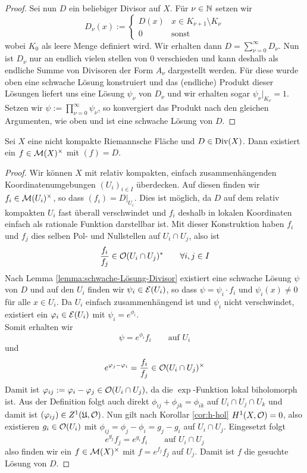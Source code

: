 \begin{proof}
  Sei nun $D$ ein beliebiger Divisor auf $X$. Für $\nu \in \mathbb{N}$
  setzen wir
  \[
  D_\nu(x) := \begin{cases} D(x) & x \in K_{\nu+1}\setminus K_\nu\\ 0
    & \text{sonst}\end{cases}
  \]
  wobei $K_0$ als leere Menge definiert wird. Wir erhalten dann $D =
  \sum_{\nu = 0}^\infty D_\nu$. 
  Nun ist $D_\nu$ nur an endlich vielen stellen von 0 verschieden und
  kann deshalb als endliche Summe von Divisoren der Form $A_\nu$
  dargestellt werden. Für diese wurde oben eine schwache Lösung
  konstruiert und das (endliche) Produkt dieser Lösungen liefert uns
  eine Lösung $\psi_\nu$ von $D_\nu$ und wir erhalten sogar $\psi_\nu
  |_{K_\nu} = 1$. 
  Setzen wir $\psi := \prod_{\nu=0}^\infty \psi_\nu$, so
  konvergiert das Produkt nach den gleichen Argumenten, wie oben und
  ist eine schwache Lösung von $D$.
\end{proof}

\begin{thm}
  \label{thm:Lösung-Divisor}
  Sei $X$ eine nicht kompakte Riemannsche Fläche und $D \in
  \operatorname{Div}(X)$. Dann existiert ein $f \in \mathcal{M}(X)^\times$ mit $(f) = D$.
\end{thm}

\begin{proof}
  Wir können $X$ mit relativ kompakten, einfach zusammenhängenden
  Koordinatenumgebungen $(U_i)_{i \in I}$ überdecken. Auf diesen
  finden wir $f_i \in \mathcal{M}(U_i)^\times$, so dass $(f_i) =
  D|_{U_i}$. Dies ist möglich, da $D$ auf dem relativ kompakten $U_i$
  fast überall verschwindet und $f_i$ deshalb in lokalen Koordinaten
  einfach als rationale Funktion darstellbar ist. 
  Mit dieser Konstruktion haben $f_i$ und $f_j$ dies selben Pol- und
  Nullstellen auf $U_i \cap U_j$, also ist
  \[
  \frac{f_i}{f_j} \in \mathcal{O}(U_i \cap U_j)^\ast \qquad \forall i,j \in I
  \]
  Nach Lemma \ref{lemma:schwache-Lösung-Divisor} existiert eine
  schwache Lösung $\psi$ von $D$ und auf den $U_i$ finden wir $\psi_i
  \in \mathcal{E}(U_i)$, so dass $\psi = \psi_i \cdot f_i$ und $\psi_i(x)
  \neq 0$ für alle $x \in U_i$. 
  Da $U_i$ einfach zusammenhängend ist und $\psi_i$ nicht
  verschwindet, existiert ein $\varphi_i \in \mathcal{E}(U_i)$ mit $\psi_i =
  e^{\phi_i}$. \\
  Somit erhalten wir
  \[
  \psi = e^{\phi_i} f_i \qquad \text{auf } U_i
  \]
  und
  \[
  e^{\varphi_j - \varphi_i} = \frac{f_i}{f_j} \in \mathcal{O}(U_i \cap U_j)^\times
  \]
  Damit ist $\varphi_{ij} := \varphi_i - \varphi_j \in \mathcal{O}(U_i \cap U_j)$, da
  die $\exp$-Funktion lokal biholomorph ist. Aus der Definition folgt
  auch direkt $\phi_{ij} + \phi_{jk} = \phi_{ik}$ auf $U_i \cap U_j
  \cap U_k$ und damit ist $(\varphi_{ij}) \in Z^1(\mathfrak{U}, \mathcal{O})$. 
  Nun gilt nach Korollar \ref{cor:h-hol} $H^1(X, \mathcal{O}) = 0$, also existieren $g_i \in \mathcal{O}(U_i)$ mit
  $\phi_{ij} = \phi_j - \phi_i = g_j - g_i$ auf $U_i \cap U_j$.
  Eingesetzt folgt
  \[
  e^{g_j} f_j = e^{g_i} f_i \qquad \text{auf } U_i \cap U_j
  \]
  also finden wir ein $f \in \mathcal{M}(X)^\times$ mit $f = e^{f_j} f_j$ auf
  $U_j$. Damit ist $f$ die gesuchte Lösung von $D$.
\end{proof}

